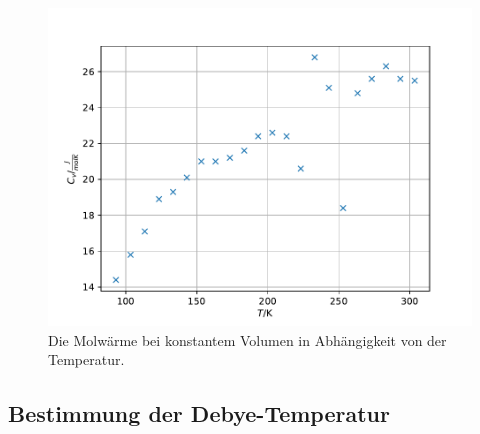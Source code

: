 \begin{figure}
  \centering
  \includegraphics{cv.pdf}
  \caption{Die Molwärme bei konstantem Volumen in Abhängigkeit von der Temperatur.}
  \label{fig:cv}
\end{figure}






\subsection{Bestimmung der Debye-Temperatur}
 
 
 



 
 
 
 
 
 

 
 




